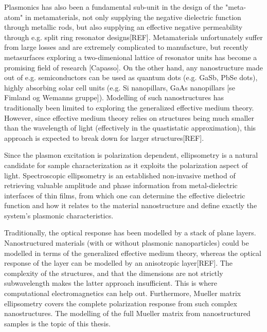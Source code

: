Plasmonics has also been a fundamental sub-unit in the design of the "meta-atom" in metamaterials, not only supplying the negative dielectric function through metallic rods, but also supplying an effective negative permeability through e.g. split ring resonator designs[REF]. Metamaterials unfortunately suffer from large losses and are extremely complicated to manufacture, but recently metasurfaces exploring a two-dimenional lattice of resonator units has become a promising field of research [Capasso].
On the other hand, any nanostructure made out of e.g. semiconductors can be used as quantum dots (e.g. GaSb, PbSe dots), highly absorbing solar cell units (e.g. Si nanopillars, GaAs nanopillars [se Fimland og Wemanns gruppe]). Modelling of such nanostructures has traditionally been limited to exploring the generalized effective medium theory. However, since effective medium theory relies on structures being much smaller than the wavelength of light (effectively in the quastistatic approximation), this approach is expected to break down for larger structures[REF].



Since the plasmon excitation is polarization dependent\cite{maier}, ellipsometry is a natural candidate for sample characterization as it exploits the polarization aspect of light. Spectroscopic ellipsometry is an established non-invasive method of retrieving valuable amplitude and phase information from metal-dielectric interfaces of thin films, from which one can determine the effective dielectric function and how it relates to the material nanostructure and define exactly the system's plasmonic characteristics\cite{hans_arwin_reviewarticle}. 

Traditionally, the optical response has been modelled by a stack of plane layers. Nanostructured materials (with or without plasmonic nanoparticles) could be modelled in terms of the generalized effective medium theory, whereas the optical response of the layer can be modelled by an anisotropic layer[REF]. The complexity of the structures, and that the dimensions are not strictly subwavelength makes the latter approach insufficient. This is where computational electromagnetics can help out. Furthermore, Mueller matrix ellipsometry covers the complete polarization response from such complex nanostructures. The modelling of the full Mueller matrix from nanostructured samples is the topic of this thesis.


